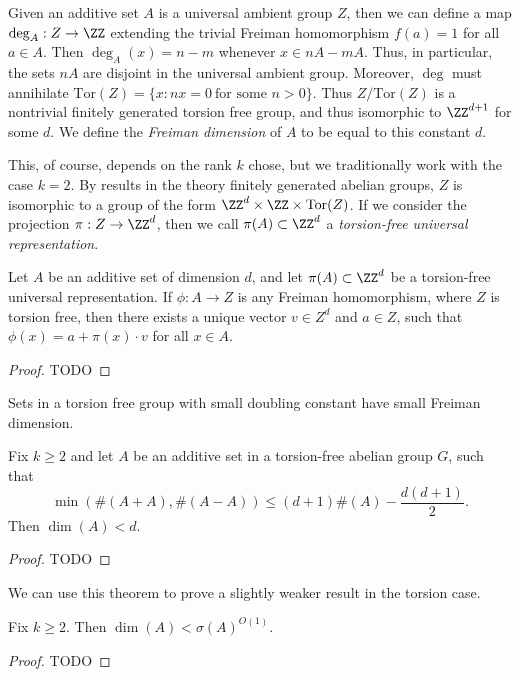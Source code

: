 Given an additive set $A$ is a universal ambient group $Z$, then we can define a map $\deg_A: Z \to \ZZ$ extending the trivial Freiman homomorphism $f(a) = 1$ for all $a \in A$. Then $\deg_A(x) = n - m$ whenever $x \in nA - mA$. Thus, in particular, the sets $nA$ are disjoint in the universal ambient group. Moreover, $\deg$ must annihilate $\text{Tor}(Z) = \{ x : nx = 0\ \text{for some $n > 0$} \}$. Thus $Z/\text{Tor}(Z)$ is a nontrivial finitely generated torsion free group, and thus isomorphic to $\ZZ^{d+1}$ for some $d$. We define the \emph{Freiman dimension} of $A$ to be equal to this constant $d$.

This, of course, depends on the rank $k$ chose, but we traditionally work with the case $k = 2$. By results in the theory finitely generated abelian groups, $Z$ is isomorphic to a group of the form $\ZZ^d \times \ZZ \times \text{Tor}(Z)$. If we consider the projection $\pi: Z \to \ZZ^d$, then we call $\pi(A) \subset \ZZ^d$ a \emph{torsion-free universal representation}.

\begin{theorem}
    Let $A$ be an additive set of dimension $d$, and let $\pi(A) \subset \ZZ^d$ be a torsion-free universal representation. If $\phi: A \to Z$ is any Freiman homomorphism, where $Z$ is torsion free, then there exists a unique vector $v \in Z^d$ and $a \in Z$, such that $\phi(x) = a + \pi(x) \cdot v$ for all $x \in A$.
\end{theorem}
\begin{proof}
    TODO
\end{proof}

Sets in a torsion free group with small doubling constant have small Freiman dimension.

\begin{theorem}
    Fix $k \geq 2$ and let $A$ be an additive set in a torsion-free abelian group $G$, such that
    \[ \min(\#(A + A), \#(A - A)) \leq (d+1) \#(A) - \frac{d(d+1)}{2}. \]
    Then $\dim(A) < d$.
\end{theorem}
\begin{proof}
    TODO
\end{proof}

We can use this theorem to prove a slightly weaker result in the torsion case.

\begin{corollary}
    Fix $k \geq 2$. Then $\dim(A) < \sigma(A)^{O(1)}$.
\end{corollary}
\begin{proof}
    TODO
\end{proof}

